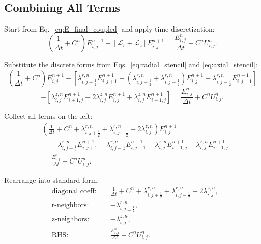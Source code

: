 \documentclass[12pt,oneside]{article}
\begin{document}
\subsection{Combining All Terms}

Start from Eq.~\eqref{eq:E_final_coupled} and apply time discretization:
\begin{equation}
\left(\frac{1}{\Delta t} + C^n\right) E^{n+1}_{i,j}
-
\left[\mathcal{L}_r + \mathcal{L}_z\right] E^{n+1}_{i,j}
=
\frac{E^n_{i,j}}{\Delta t}
+
C^n U^n_{i,j}.
\end{equation}

Substitute the discrete forms from Eqs.~\eqref{eq:radial_stencil} and \eqref{eq:axial_stencil}:
\begin{equation}
\left(\frac{1}{\Delta t} + C^n\right) E^{n+1}_{i,j}
-\left[
\lambda^{r,n}_{i,j+\frac12} E^{n+1}_{i,j+1}
-
(\lambda^{r,n}_{i,j+\frac12} + \lambda^{r,n}_{i,j-\frac12}) E^{n+1}_{i,j}
+
\lambda^{r,n}_{i,j-\frac12} E^{n+1}_{i,j-1}
\right]
\end{equation}
\begin{equation}
-\left[
\lambda^{z,n}_{i,j} E^{n+1}_{i+1,j}
-
2\lambda^{z,n}_{i,j} E^{n+1}_{i,j}
+
\lambda^{z,n}_{i,j} E^{n+1}_{i-1,j}
\right]
=
\frac{E^n_{i,j}}{\Delta t}
+
C^n U^n_{i,j}.
\end{equation}

Collect all terms on the left:
\begin{align}
&\left(\frac{1}{\Delta t} + C^n + \lambda^{r,n}_{i,j+\frac12} + \lambda^{r,n}_{i,j-\frac12} + 2\lambda^{z,n}_{i,j}\right) E^{n+1}_{i,j}\\
&\quad - \lambda^{r,n}_{i,j+\frac12} E^{n+1}_{i,j+1}
- \lambda^{r,n}_{i,j-\frac12} E^{n+1}_{i,j-1}
- \lambda^{z,n}_{i,j} E^{n+1}_{i+1,j}
- \lambda^{z,n}_{i,j} E^{n+1}_{i-1,j}\\
&=
\frac{E^n_{i,j}}{\Delta t}
+
C^n U^n_{i,j}.
\end{align}

Rearrange into standard form:
\begin{equation}
\boxed{
\begin{alignedat}{2}
&\text{diagonal coeff: }&&
\frac{1}{\Delta t} + C^n + \lambda^{r,n}_{i,j+\frac12} + \lambda^{r,n}_{i,j-\frac12} + 2\lambda^{z,n}_{i,j},\\
&\text{r-neighbors: }&&
-\lambda^{r,n}_{i,j\pm\frac12},\\
&\text{z-neighbors: }&&
-\lambda^{z,n}_{i,j},\\
&\text{RHS: }&&
\frac{E^n_{i,j}}{\Delta t}
+
C^n U^n_{i,j}.
\end{alignedat}
}
\label{eq:5point_interior}
\end{equation}
\end{document}
